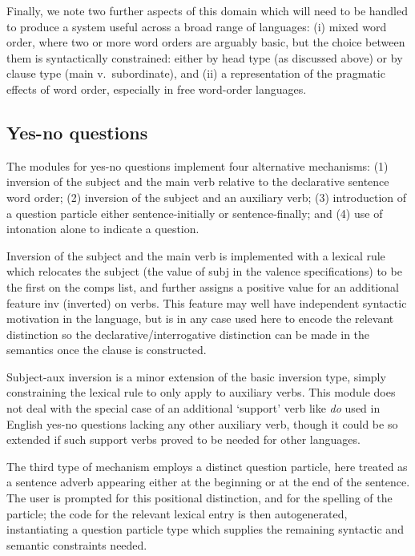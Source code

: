 Finally, we note two further aspects of this domain which will need
to be handled to produce a system useful across a broad range of
languages: (i) mixed word order, where two or more word
orders are arguably basic, but the choice between them is syntactically
constrained: either by head type (as discussed above) or by clause
type (main v.\ subordinate), and (ii) a representation of the
pragmatic effects of word order, especially in free word-order
languages.


\subsection{Yes-no questions}

The modules for yes-no questions implement four alternative mechanisms:
(1) inversion of the subject and the main verb relative to the declarative
sentence word order; (2) inversion of the subject and an auxiliary
verb; (3) introduction of a question particle either sentence-initially or
sentence-finally; and (4) use of intonation alone to indicate a question.

Inversion of the subject and the main verb is implemented with a lexical
rule which relocates the subject (the value of {\sc subj} in the valence
specifications) to be the first on the {\sc comps} list, and further
assigns a positive value for an additional feature {\sc inv} (inverted)
on verbs.  This feature may well have independent syntactic motivation in 
the language, but is in any case used here to encode the relevant distinction
so the declarative/interrogative distinction can be made in the semantics
once the clause is constructed.

Subject-aux inversion is a minor extension of the basic inversion type,
simply constraining the lexical rule to only apply to auxiliary verbs.
This module does not deal with the special case of an additional `support'
verb like {\it do} used in English yes-no questions lacking any other
auxiliary verb, though it could be so extended if such support verbs
proved to be needed for other languages.

The third type of mechanism employs a distinct question particle, here
treated as a sentence adverb appearing either at the beginning or at the
end of the sentence.  The user is prompted for this positional distinction,
and for the spelling of the particle; the code for the relevant lexical
entry is then autogenerated, instantiating a question particle type which
supplies the remaining syntactic and semantic constraints needed.


